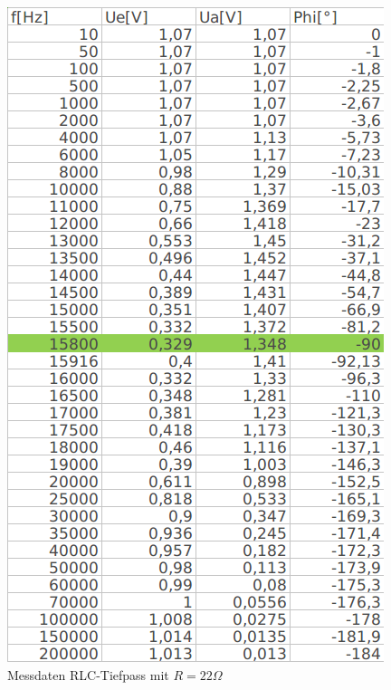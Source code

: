 \documentclass[12pt,a4paper,titlepage]{article}
\begin{document}
\begin{figure}[H]
  \centering
  \begin{minipage}[b]{0.3\textwidth}
    \includegraphics[width=\textwidth]{rlc_22_data.png}
    \caption{Messdaten RLC-Tiefpass mit $R=22\Omega$}
  \end{minipage}
  \hfill
  \begin{minipage}[b]{0.3\textwidth}

\end{minipage}
\end{figure}
\end{document}
